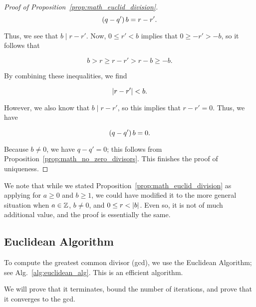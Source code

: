 \begin{proof}[Proof of Proposition~\ref{prop:math_euclid_division}]
\begin{equation}
    \left( q-q' \right)b = r-r'.
\end{equation}

\noindent
Thus, we see that $b\mid r-r'$.
Now, $0\le r' < b$ implies that $0\ge -r' > -b$, so it follows
that

\begin{equation}
    b > r \ge r - r' > r - b\ge -b.
\end{equation}

\noindent
By combining these inequalities, we find

\begin{equation}
    \left| r-r' \right| < b.
\end{equation}

\noindent
However, we also know that $b \mid r-r'$, so this implies that $r-r' = 0$.
Thus, we have

\begin{equation}
    \left( q-q' \right)b = 0.
\end{equation}

\noindent
Because $b\ne0$, we have $q - q'=0$;
this follows from Proposition~\ref{prop:math_no_zero_divisors}.
This finishes the proof of uniqueness.
\end{proof}

We note that while we stated Proposition~\ref{prop:math_euclid_division}
as applying for $a\ge0$ and $b\ge1$, we could have modified it to the more
general situation when $a\in\mathbb{Z}$, $b\ne0$, and $0 \le r < \left| b \right|$.
Even so, it is not of much additional value,
and the proof is essentially the same.


\subsection{Euclidean Algorithm}

To compute the greatest common divisor (gcd),
we use the Euclidean Algorithm;
see Alg.~\ref{alg:euclidean_alg}.
This is an efficient algorithm.



We will prove that it terminates, bound the number of iterations,
and prove that it converges to the gcd.

